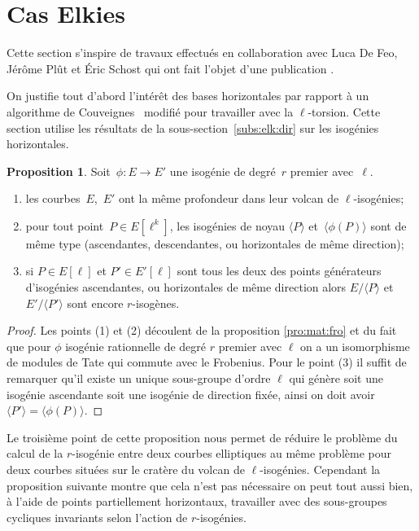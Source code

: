 \documentclass[10pt,a4paper]{book}
\theoremstyle{plain}
\theoremstyle{definition}
\theoremstyle{definition}
\theoremstyle{definition}
\newtheorem{prop}[thm]{Proposition}
\theoremstyle{definition}
\theoremstyle{remark}
\theoremstyle{remark}
\theoremstyle{definition}
\begin{document}
\section{Cas Elkies}
 Cette section s'inspire de travaux effectués en collaboration avec Luca De Feo,
J\'er\^ome Pl\^ut et \'Eric Schost qui ont fait l'objet d'une publication 
\cite{Defeo_Plut_Schost_2016}. 

On justifie tout d'abord l'intérêt des bases horizontales par rapport à un 
algorithme de Couveignes~\cite{Couveignes96} modifié pour travailler avec la
$\ell$-torsion. Cette section utilise les résultats de la 
sous-section~\ref{subs:elk:dir} sur les isogénies horizontales.

\begin{prop}\label{pro:par:iso}
Soit~$\phi: E \rightarrow E'$ une isogénie de degré~$r$ premier avec~$\ell$.
\begin{enumerate}
\item les courbes~$E$,~$E'$ ont la même profondeur dans leur volcan de
 $\ell$-isogénies;
\item\label{pro:par:fun} pour tout point~$P \in E[\ell^k]$,
les isogénies de noyau $\langle P \rangle$ et~$\langle \phi(P) \rangle$ sont de même type
(ascendantes, descendantes, ou horizontales de même direction);
\item\label{pro:par:asc} si $P \in E[\ell]$ et $P' \in E'[\ell]$ sont tous les 
deux des points générateurs d'isogénies ascendantes, ou horizontales de même 
direction alors $E/\langle P \rangle$ et~$E'/\langle P' \rangle$ sont encore $r$-isogènes.
\end{enumerate}
\end{prop}

\begin{proof}
Les points (1) et (2) découlent de la proposition \ref{pro:mat:fro} et du fait que pour $\phi$ isogénie rationnelle de degré $r$ premier avec $\ell$ on a un isomorphisme de modules de Tate qui commute avec le Frobenius. Pour le point (3) il suffit de remarquer qu'il existe un unique sous-groupe d'ordre $\ell$ qui génère soit une isogénie ascendante soit une isogénie de direction fixée, ainsi on doit avoir $\langle P' \rangle=\langle \phi(P) \rangle$.

\end{proof}
Le troisième point de cette proposition nous permet de réduire le problème du 
calcul de la $r$-isogénie entre deux courbes elliptiques au même problème pour 
deux courbes situées sur le cratère du volcan de $\ell$-isogénies. Cependant la
proposition suivante montre que cela n'est pas nécessaire on peut tout aussi 
bien, à l'aide de points partiellement horizontaux, travailler avec des 
sous-groupes cycliques invariants selon l'action de $r$-isogénies. 
\end{document}
